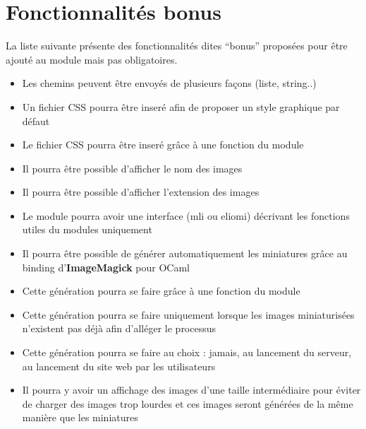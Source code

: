 \documentclass{life-fr}
\begin{document}
\newpage

\section{Fonctionnalités bonus}

La liste suivante présente des fonctionnalités dites ``bonus'' proposées pour
être ajouté au module mais pas obligatoires.

\begin{itemize}
  \item Les chemins peuvent être envoyés de plusieurs façons (liste, string..)
\end{itemize}
\begin{itemize}
  \item Un fichier CSS pourra être inseré afin de proposer un style graphique
    par défaut
  \item Le fichier CSS pourra être inseré grâce à une fonction du module
\end{itemize}
\begin{itemize}
  \item Il pourra être possible d'afficher le nom des images
  \item Il pourra être possible d'afficher l'extension des images
\end{itemize}
\begin{itemize}
  \item Le module pourra avoir une interface (mli ou eliomi) décrivant les
    fonctions utiles du modules uniquement
\end{itemize}
\begin{itemize}
  \item Il pourra être possible de générer automatiquement les miniatures
    grâce au binding d'\textbf{ImageMagick} pour OCaml
  \item Cette génération pourra se faire grâce à une fonction du module
  \item Cette génération pourra se faire uniquement lorsque les images
    miniaturisées n'existent pas déjà afin d'alléger le processus
  \item Cette génération pourra se faire au choix : jamais, au lancement
    du serveur, au lancement du site web par les utilisateurs
\end{itemize}
\begin{itemize}
  \item Il pourra y avoir un affichage des images d'une taille intermédiaire
    pour éviter de charger des images trop lourdes et ces images seront
    générées de la même manière que les miniatures
\end{itemize}
\end{document}
